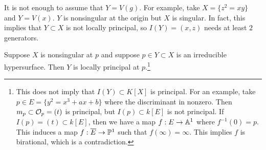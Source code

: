 \documentclass[twoside, 10pt]{article}
\begin{document}
    \begin{rmk} It is not enough to assume that $Y = V(g)$. For example, take
        $X = \{z^2=xy\}$ and $Y = V(x)$. $Y$ is nonsingular at the origin but
        $X$ is singular. In fact, this implies that $Y \subset X$ is not
        locally principal, so $I(Y) = (x,z)$ needs at least $2$ generators.
    \end{rmk}

    \begin{thm} Suppose $X$ is nonsingular at $p$ and suppose $p \in Y \subset
        X$ is an irreducible hypersurface. Then $Y$ is locally principal at
        $p$.\footnote{This does not imply that $I(Y) \subset K[X]$ is
            principal. For an example, take $p \in E = \{y^2 = x^3+ax+b\}$
            where the discriminant in nonzero. Then $m_p \subset \mc{O}_p =
            (t)$ is principal, but $I(p) \subset k[E]$ is not principal. If
            $I(p) = (t) \subset k[E]$, then we have a map $f:E \to \A^1$ where
            $f^{-1}(0) = p$. This induces a map $f:\overline{E} \to \P^1$ such
    that $f(\infty) = \infty$. This implies $f$ is birational, which is a
    contradiction.} \end{thm}
\end{document}
